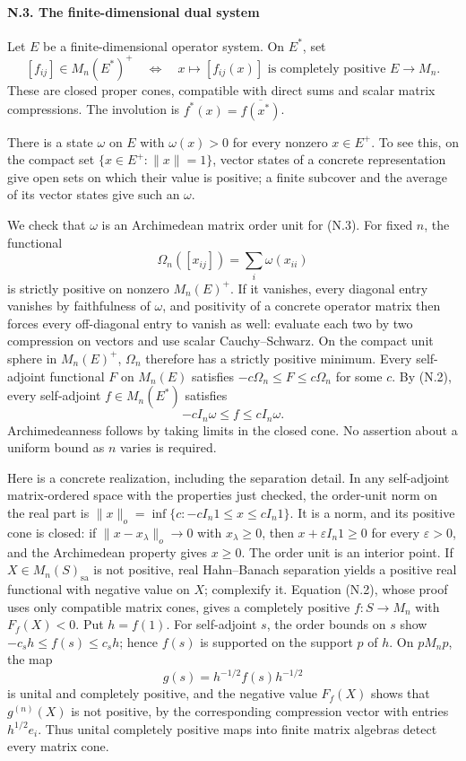 \documentclass[
  11pt,
]{article}
\begin{document}
\paragraph{N.3. The finite-dimensional dual
system}\label{n.3.-the-finite-dimensional-dual-system}

Let \(E\) be a finite-dimensional operator system. On \(E^*\), set \[
[f_{ij}]\in M_n(E^*)^+
\quad\Longleftrightarrow\quad
x\longmapsto[f_{ij}(x)]\text{ is completely positive }E\to M_n.
\tag{N.3}
\] These are closed proper cones, compatible with direct sums and scalar
matrix compressions. The involution is \(f^*(x)=\overline{f(x^*)}\).

There is a state \(\omega\) on \(E\) with \(\omega(x)>0\) for every
nonzero \(x\in E^+\). To see this, on the compact set
\(\{x\in E^+:\|x\|=1\}\), vector states of a concrete representation
give open sets on which their value is positive; a finite subcover and
the average of its vector states give such an \(\omega\).

We check that \(\omega\) is an Archimedean matrix order unit for (N.3).
For fixed \(n\), the functional \[
\Omega_n([x_{ij}])=\sum_i\omega(x_{ii})
\] is strictly positive on nonzero \(M_n(E)^+\). If it vanishes, every
diagonal entry vanishes by faithfulness of \(\omega\), and positivity of
a concrete operator matrix then forces every off-diagonal entry to
vanish as well: evaluate each two by two compression on vectors and use
scalar Cauchy--Schwarz. On the compact unit sphere in \(M_n(E)^+\),
\(\Omega_n\) therefore has a strictly positive minimum. Every
self-adjoint functional \(F\) on \(M_n(E)\) satisfies
\(-c\Omega_n\leq F\leq c\Omega_n\) for some \(c\). By (N.2), every
self-adjoint \(f\in M_n(E^*)\) satisfies \[
-cI_n\omega\leq f\leq cI_n\omega.
\] Archimedeanness follows by taking limits in the closed cone. No
assertion about a uniform bound as \(n\) varies is required.

Here is a concrete realization, including the separation detail. In any
self-adjoint matrix-ordered space with the properties just checked, the
order-unit norm on the real part is
\(\|x\|_o=\inf\{c:-cI_n1\leq x\leq cI_n1\}\). It is a norm, and its
positive cone is closed: if \(\|x-x_\lambda\|_o\to0\) with
\(x_\lambda\geq0\), then \(x+\varepsilon I_n1\geq0\) for every
\(\varepsilon>0\), and the Archimedean property gives \(x\geq0\). The
order unit is an interior point. If \(X\in M_n(S)_{\mathrm{sa}}\) is not
positive, real Hahn--Banach separation yields a positive real functional
with negative value on \(X\); complexify it. Equation (N.2), whose proof
uses only compatible matrix cones, gives a completely positive
\(f:S\to M_n\) with \(F_f(X)<0\). Put \(h=f(1)\). For self-adjoint
\(s\), the order bounds on \(s\) show \(-c_s h\leq f(s)\leq c_s h\);
hence \(f(s)\) is supported on the support \(p\) of \(h\). On \(pM_np\),
the map \[
g(s)=h^{-1/2}f(s)h^{-1/2}
\] is unital and completely positive, and the negative value \(F_f(X)\)
shows that \(g^{(n)}(X)\) is not positive, by the corresponding
compression vector with entries \(h^{1/2}e_i\). Thus unital completely
positive maps into finite matrix algebras detect every matrix cone.
\end{document}
